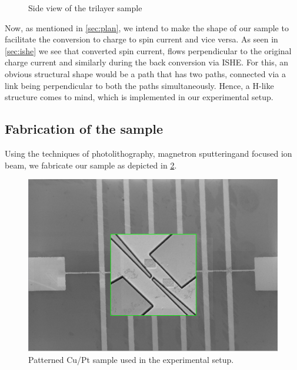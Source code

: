 \begin{figure}
    \centering
{}
    \caption{Side view of the trilayer sample}
    \label{fig:layers}
\end{figure}

Now, as mentioned in \cref{sec:plan}, we intend to make the shape of our sample to facilitate the conversion to charge to spin current and vice versa.
As seen in \cref{sec:ishe} we see that converted spin current, flows perpendicular to the original charge current and similarly during the back conversion via ISHE.
For this, an obvious structural shape would be a path that has two paths, connected via a link being perpendicular to both the paths simultaneously.
Hence, a \textsc{H}-like structure comes to mind, which is implemented in our experimental setup.

\subsection{Fabrication of the sample}

Using the techniques of photolithography\footnotemark, magnetron sputtering\footnotemark[\value{footnote}] and focused ion beam\footnotemark[\value{footnote}], we fabricate our sample as depicted in \cref{fig:fabrication-sample}.

\begin{figure}[h!]
    \centering
    \includegraphics[scale=0.35]{newtrack.png}
    \caption{Patterned Cu/Pt sample used in the experimental setup.}
    \label{fig:fabrication-sample}
\end{figure}

